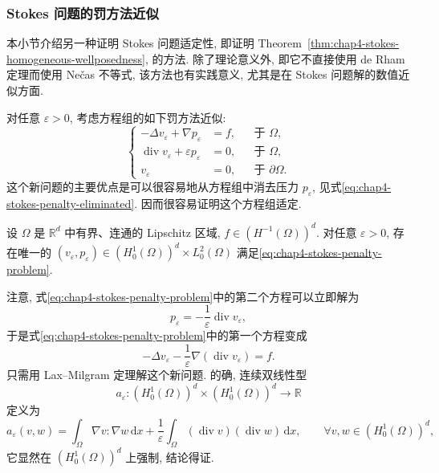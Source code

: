 \subsubsection{Stokes 问题的罚方法近似}
\label{subsec:chap4-stokes-penalty}

本小节介绍另一种证明 Stokes 问题适定性, 即证明 Theorem~\ref{thm:chap4-stokes-homogeneous-wellposedness}, 的方法. 除了理论意义外, 即它不直接使用 de Rham 定理而使用 Nečas 不等式, 该方法也有实践意义, 尤其是在 Stokes 问题解的数值近似方面.

对任意 $\varepsilon>0$, 考虑方程组的如下罚方法近似:
\begin{equation}
 \left\{
 \begin{aligned}
  -\Delta v_\varepsilon+\nabla p_\varepsilon&=f,&&\text{于 }\Omega,\\
  \operatorname{div}v_\varepsilon+\varepsilon p_\varepsilon&=0,&&\text{于 }\Omega,\\
  v_\varepsilon&=0,&&\text{于 }\partial\Omega.
 \end{aligned}
 \right.
 \label{eq:chap4-stokes-penalty-problem}
\end{equation}
这个新问题的主要优点是可以很容易地从方程组中消去压力 $p_\varepsilon$, 见式\eqref{eq:chap4-stokes-penalty-eliminated}. 因而很容易证明这个方程组适定.

\begin{Lemma}
\label{lem:chap4-stokes-penalty-wellposedness}
设 $\Omega$ 是 $\mathbb R^d$ 中有界、连通的 Lipschitz 区域, $f\in(H^{-1}(\Omega))^d$. 对任意 $\varepsilon>0$, 存在唯一的 $(v_\varepsilon,p_\varepsilon)\in(H_0^1(\Omega))^d\times L_0^2(\Omega)$ 满足\eqref{eq:chap4-stokes-penalty-problem}.
\end{Lemma}

\begin{Proof}
注意, 式\eqref{eq:chap4-stokes-penalty-problem}中的第二个方程可以立即解为
\begin{equation}
 p_\varepsilon=-\frac1\varepsilon\operatorname{div}v_\varepsilon,
 \label{eq:chap4-stokes-penalty-pressure}
\end{equation}
于是式\eqref{eq:chap4-stokes-penalty-problem}中的第一个方程变成
\begin{equation}
 -\Delta v_\varepsilon-\frac1\varepsilon\nabla(\operatorname{div}v_\varepsilon)=f.
 \label{eq:chap4-stokes-penalty-eliminated}
\end{equation}
只需用 Lax--Milgram 定理解这个新问题. 的确, 连续双线性型
\[
 a_\varepsilon:(H_0^1(\Omega))^d\times(H_0^1(\Omega))^d\longrightarrow\mathbb R
\]
定义为
\[
 a_\varepsilon(v,w)=\int_\Omega\nabla v:\nabla w\,\mathrm dx
 +\frac1\varepsilon\int_\Omega(\operatorname{div}v)(\operatorname{div}w)\,\mathrm dx,
 \qquad\forall v,w\in(H_0^1(\Omega))^d,
\]
它显然在 $(H_0^1(\Omega))^d$ 上强制, 结论得证.
\end{Proof}

